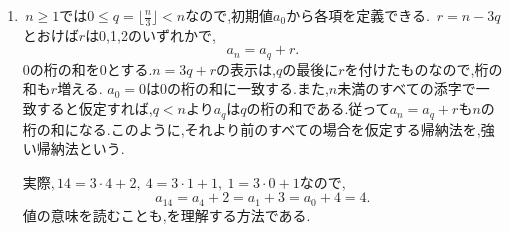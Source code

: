     \noindent {}\par\nobreak
    \begin{enumerate}[label=(\arabic*),parsep=3pt,beginpenalty=10000,format=\bookitemlink{example-gauss-role-8}{solution}{problem}]
      \item \,$n\ge1$では$0\le q=\lfloor\frac n3\rfloor<n$なので,初期値$a_0$から各項を定義できる.
            \,$r=n-3q$とおけば$r$は0,1,2のいずれかで,
            \[
              a_n=a_q+r.
            \]
            0の桁の和を0とする.$n=3q+r$の表示は,$q$の最後に$r$を付けたものなので,桁の和も$r$増える.
            $a_0=0$は0の桁の和に一致する.また,$n$未満のすべての添字で一致すると仮定すれば,$q<n$より$a_q$は$q$の桁の和である.従って$a_n=a_q+r$も$n$の桁の和になる.このように,それより前のすべての場合を仮定する帰納法を,強い帰納法という.

            実際,\,$14=3\cdot4+2,\ 4=3\cdot1+1,\ 1=3\cdot0+1$なので,
            \[
              a_{14}=a_4+2=a_1+3=a_0+4=4.
            \]
            値の意味を読むことも,を理解する方法である.
    \end{enumerate}
